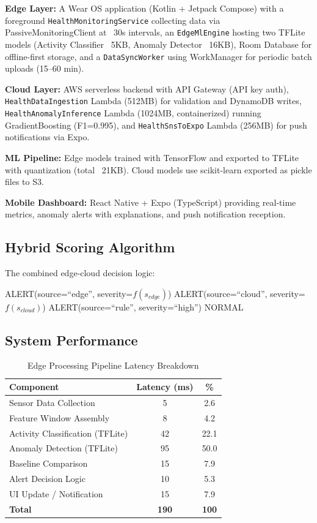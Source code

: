 \documentclass[conference]{IEEEtran}
\begin{document}
\textbf{Edge Layer:} A Wear OS application (Kotlin + Jetpack Compose) with a foreground \texttt{HealthMonitoringService} collecting data via PassiveMonitoringClient at ~30s intervals, an \texttt{EdgeMlEngine} hosting two TFLite models (Activity Classifier ~5KB, Anomaly Detector ~16KB), Room Database for offline-first storage, and a \texttt{DataSyncWorker} using WorkManager for periodic batch uploads (15--60 min).

\textbf{Cloud Layer:} AWS serverless backend with API Gateway (API key auth), \texttt{HealthDataIngestion} Lambda (512MB) for validation and DynamoDB writes, \texttt{HealthAnomalyInference} Lambda (1024MB, containerized) running GradientBoosting (F1=0.995), and \texttt{HealthSnsToExpo} Lambda (256MB) for push notifications via Expo.

\textbf{ML Pipeline:} Edge models trained with TensorFlow and exported to TFLite with quantization (total ~21KB). Cloud models use scikit-learn exported as pickle files to S3.

\textbf{Mobile Dashboard:} React Native + Expo (TypeScript) providing real-time metrics, anomaly alerts with explanations, and push notification reception.

\subsection{Hybrid Scoring Algorithm}
The combined edge-cloud decision logic:
\begin{algorithmic}
    \STATE ALERT(source=``edge'', severity=$f(s_{edge})$)
    \STATE ALERT(source=``cloud'', severity=$f(s_{cloud})$)
    \STATE ALERT(source=``rule'', severity=``high'')
\ELSE
    \STATE NORMAL
\ENDIF
\end{algorithmic}

\subsection{System Performance}

\begin{table}[H]
\centering
\caption{Edge Processing Pipeline Latency Breakdown}
\label{tab:latency}
\begin{tabular}{lcc}
\toprule
\textbf{Component} & \textbf{Latency (ms)} & \textbf{\%} \\
\midrule
Sensor Data Collection & 5 & 2.6 \\
Feature Window Assembly & 8 & 4.2 \\
Activity Classification (TFLite) & 42 & 22.1 \\
Anomaly Detection (TFLite) & 95 & 50.0 \\
Baseline Comparison & 15 & 7.9 \\
Alert Decision Logic & 10 & 5.3 \\
UI Update / Notification & 15 & 7.9 \\
\midrule
\textbf{Total} & \textbf{190} & \textbf{100} \\
\bottomrule
\end{tabular}
\end{table}
\end{document}
